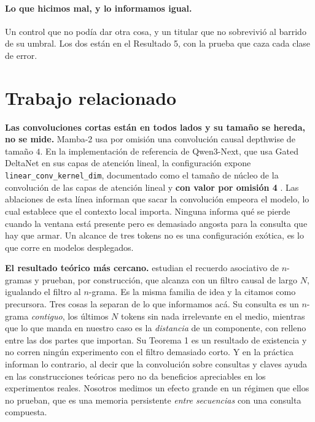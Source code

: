 \documentclass[11pt,a4paper]{article}
\begin{document}
\paragraph{Lo que hicimos mal, y lo informamos igual.} Un control que no podía dar otra cosa, y un
titular que no sobrevivió al barrido de su umbral. Los dos están en el Resultado 5, con la prueba que
caza cada clase de error.

\section{Trabajo relacionado}

\textbf{Las convoluciones cortas están en todos lados y su tamaño se hereda, no se mide.} Mamba-2
\citep{mamba2} usa por omisión una convolución causal depthwise de tamaño $4$. En la implementación de
referencia de Qwen3-Next, que usa Gated DeltaNet \citep{gateddeltanet} en sus capas de atención lineal,
la configuración expone \texttt{linear\_conv\_kernel\_dim}, documentado como el tamaño de núcleo de la
convolución de las capas de atención lineal y \textbf{con valor por omisión 4} \citep{qwen3next}. Las
ablaciones de esta línea informan que sacar la convolución empeora el modelo, lo cual establece que el
contexto local importa. Ninguna informa qué se pierde cuando la ventana está presente pero es
demasiado angosta para la consulta que hay que armar. Un alcance de tres tokens no es una
configuración exótica, es lo que corre en modelos desplegados.

\textbf{El resultado teórico más cercano.} \citet{cat} estudian el recuerdo asociativo de $n$-gramas y
prueban, por construcción, que alcanza con un filtro causal de largo $N$, igualando el filtro al
$n$-grama. Es la misma familia de idea y la citamos como precursora. Tres cosas la separan de lo que
informamos acá. Su consulta es un $n$-grama \emph{contiguo}, los últimos $N$ tokens sin nada
irrelevante en el medio, mientras que lo que manda en nuestro caso es la \emph{distancia} de un
componente, con relleno entre las dos partes que importan. Su Teorema 1 es un resultado de existencia
y no corren ningún experimento con el filtro demasiado corto. Y en la práctica informan lo contrario,
al decir que la convolución sobre consultas y claves ayuda en las construcciones teóricas pero no da
beneficios apreciables en los experimentos reales. Nosotros medimos un efecto grande en un régimen que
ellos no prueban, que es una memoria persistente \emph{entre secuencias} con una consulta compuesta.
\end{document}
